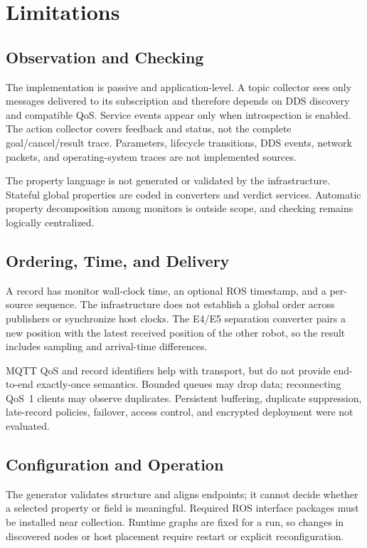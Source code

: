 \section{Limitations}

\subsection{Observation and Checking}

The implementation is passive and application-level. A topic collector sees
only messages delivered to its subscription and therefore depends on DDS
discovery and compatible QoS. Service events appear only when introspection is
enabled. The action collector covers feedback and status, not the complete
goal/cancel/result trace. Parameters, lifecycle transitions, DDS events,
network packets, and operating-system traces are not implemented sources.

The property language is not generated or validated by the infrastructure.
Stateful global properties are coded in converters and verdict services.
Automatic property decomposition among monitors is outside scope, and checking
remains logically centralized.

\subsection{Ordering, Time, and Delivery}

A record has monitor wall-clock time, an optional ROS timestamp, and a
per-source sequence. The infrastructure does not establish a global order
across publishers or synchronize host clocks. The E4/E5 separation converter
pairs a new position with the latest received position of the other robot, so
the result includes sampling and arrival-time differences.

MQTT QoS and record identifiers help with transport, but do not provide
end-to-end exactly-once semantics. Bounded queues may drop data; reconnecting
QoS~1 clients may observe duplicates. Persistent buffering, duplicate
suppression, late-record policies, failover, access control, and encrypted
deployment were not evaluated.

\subsection{Configuration and Operation}

The generator validates structure and aligns endpoints; it cannot decide
whether a selected property or field is meaningful. Required ROS interface
packages must be installed near collection. Runtime graphs are fixed for a run,
so changes in discovered nodes or host placement require restart or explicit
reconfiguration.

